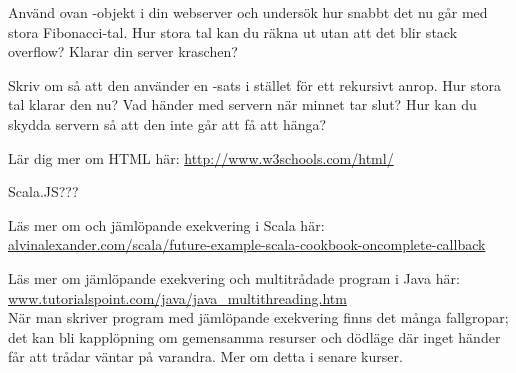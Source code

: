 \Subtask Använd ovan -objekt i din webserver och undersök hur snabbt det nu går med stora Fibonacci-tal. Hur stora tal kan du räkna ut utan att det blir stack overflow? Klarar din server kraschen?

\Subtask Skriv om  så att den använder en -sats i stället för ett rekursivt anrop. Hur stora tal klarar den nu? Vad händer med servern när minnet tar slut? Hur kan du skydda servern så att den inte går att få att hänga?


\Task Lär dig mer om HTML här: \url{http://www.w3schools.com/html/}

\Task Scala.JS???


\Task Läs mer om  och jämlöpande exekvering i Scala här:\\
\href{http://alvinalexander.com/scala/future-example-scala-cookbook-oncomplete-callback}{alvinalexander.com/scala/future-example-scala-cookbook-oncomplete-callback}

\Task Läs mer om jämlöpande exekvering och multitrådade program i Java här: \href{http://www.tutorialspoint.com/java/java_multithreading.htm}{www.tutorialspoint.com/java/java\_multithreading.htm}  \\
\noindent När man skriver program med jämlöpande exekvering finns det många fallgropar; det kan bli kapplöpning  om gemensamma resurser och dödläge  där inget händer får att trådar väntar på varandra. Mer om detta i senare kurser. 

